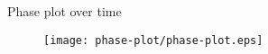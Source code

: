 \begin{frame}{Phase plot over time}%
    \begin{figure}[htb]%
        \centering%
        \texttt{[image: phase-plot/phase-plot.eps]}
    \end{figure}%
\end{frame}%
%